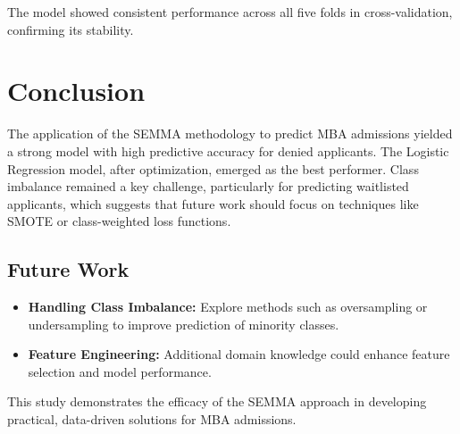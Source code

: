 \documentclass{article}
\begin{document}
The model showed consistent performance across all five folds in cross-validation, confirming its stability.

\section{Conclusion}

The application of the SEMMA methodology to predict MBA admissions yielded a strong model with high predictive accuracy for denied applicants. The Logistic Regression model, after optimization, emerged as the best performer. Class imbalance remained a key challenge, particularly for predicting waitlisted applicants, which suggests that future work should focus on techniques like SMOTE or class-weighted loss functions.

\subsection{Future Work}
\begin{itemize}
    \item \textbf{Handling Class Imbalance:} Explore methods such as oversampling or undersampling to improve prediction of minority classes.
    \item \textbf{Feature Engineering:} Additional domain knowledge could enhance feature selection and model performance.
\end{itemize}

This study demonstrates the efficacy of the SEMMA approach in developing practical, data-driven solutions for MBA admissions.
\end{document}
